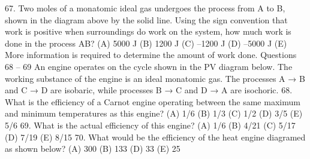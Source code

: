67. Two moles of a monatomic ideal gas undergoes the process from A to B, shown in the diagram above by the
solid line. Using the sign convention that work is positive when surroundings do work on the system, how much
work is done in the process AB?
(A) 5000 J (B) 1200 J (C) –1200 J (D) –5000 J
(E) More information is required to determine the amount of work done.
Questions 68 – 69
An engine operates on the cycle shown in the PV diagram below. The working substance of the engine is an
ideal monatomic gas. The processes A → B and C → D are isobaric, while processes B → C and D → A are
isochoric.
68. What is the efficiency of a Carnot engine operating between the same maximum and minimum temperatures as
this engine?
(A) 1/6
(B) 1/3 (C) 1/2
(D) 3/5 (E) 5/6
69. What is the actual efficiency of this engine?
(A) 1/6 (B) 4/21 (C) 5/17 (D) 7/19 (E) 8/15
70. What would be the efficiency of the heat engine diagramed as shown below?
(A) 300 %
(B) 133 %
(D) 33 %
(E) 25 %





